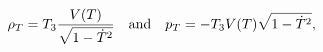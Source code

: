 \begin{equation}\label{pre}
\rho_T = T_{3}\frac{V(T)}{\sqrt{1-\dot T^2}}~~~{\rm and}
~~~p_T = -T_{3}V(T)\sqrt{1-\dot T^2},
\end{equation}

